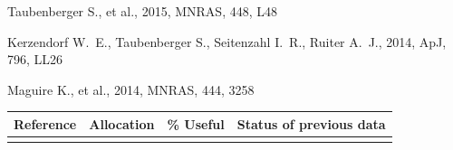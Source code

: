 \documentclass[11pt]{article}
\begin{document}
\justifyduplications


\bigskip


% 

\publications          %
\begin{thebibliography}{99}
 Taubenberger S., et al., 2015, MNRAS, 448, 
L48 

 Kerzendorf W.~E., Taubenberger S., 
Seitenzahl I.~R., Ruiter A.~J., 2014, ApJ, 796, LL26

 Maguire K., et al., 2014, MNRAS, 444, 3258
\end{thebibliography}
\bigskip



%


\otherfacilities    %


\bigskip


\thepast    %


\begin{table}[h]
\begin{center}
\begin{tabular}{llcl}
Reference & Allocation & \% Useful & Status of previous data \\
\hline
 &  &  & \\
\hline
\end{tabular}
\end{center}
\end{table}
\end{document}
